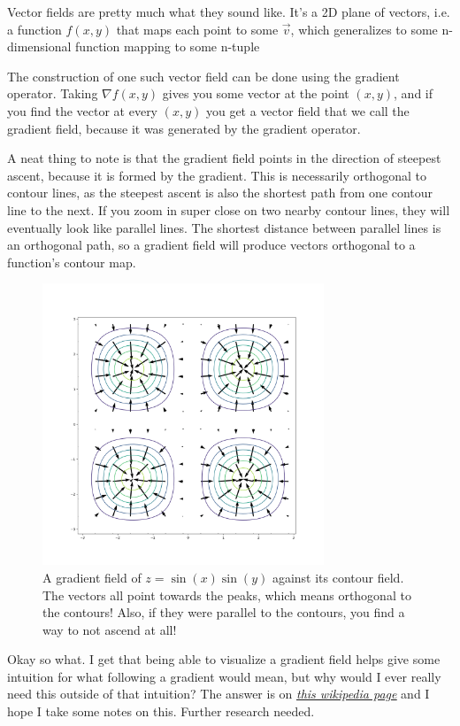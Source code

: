 \documentclass[12pt, letterpaper]{article}
\newcommand{\externalLink}[2]{\emph{\underline{\href{#1}{#2}}}}
\begin{document}
Vector fields are pretty much what they sound like. It's a 2D plane of vectors, i.e. a function $f(x, y)$ that maps each point to some $\vec{v}$, which generalizes to some n-dimensional function mapping to some n-tuple

The construction of one such vector field can be done using the gradient operator. Taking $\nabla f(x, y)$ gives you some vector at the point $(x, y)$, and if you find the vector at every $(x, y)$ you get a vector field that we call the gradient field, because it was generated by the gradient operator. 

A neat thing to note is that the gradient field points in the direction of steepest ascent, because it is formed by the gradient. This is necessarily orthogonal to contour lines, as the steepest ascent is also the shortest path from one contour line to the next. If you zoom in super close on two nearby contour lines, they will eventually look like parallel lines. The shortest distance between parallel lines is an orthogonal path, so a gradient field will produce vectors orthogonal to a function's contour map.

\begin{figure}[h]
    \centering 
    \includegraphics[width=0.75\textwidth]{orthogonalContour-min}
    \caption{A gradient field of $z = \sin(x)\sin(y)$ against its contour field. The vectors all point towards the peaks, which means orthogonal to the contours! Also, if they were parallel to the contours, you find a way to not ascend at all!}
\end{figure}

Okay so what. I get that being able to visualize a gradient field helps give some intuition for what following a gradient would mean, but why would I ever really need this outside of that intuition? 
The answer is on \externalLink{https://en.wikipedia.org/wiki/Vector_field\#Operations_on_vector_fields}{this wikipedia page} and I hope I take some notes on this. 
Further research needed.
\end{document}
